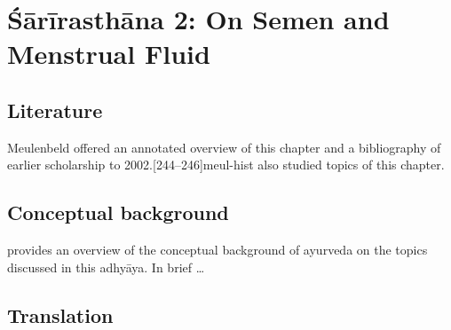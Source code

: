 
\chapter{Śārīrasthāna 2:  On Semen and Menstrual Fluid}


\section{Literature} 

Meulenbeld offered an annotated overview of this chapter and a bibliography
of earlier scholarship to 2002.[244--246]{meul-hist}  \citet[chs 
6--8]{das-2003} also studied topics of this chapter. 

\section{Conceptual background}


\citet[ch.\,13]{das-2003} provides an overview of the conceptual background of 
ayurveda on the topics discussed in this adhyāya.  In brief \ldots 

\section{Translation}

